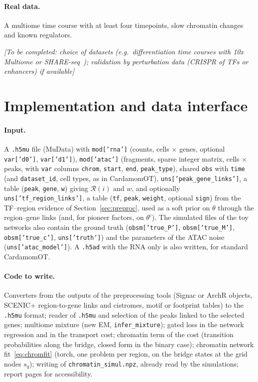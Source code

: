 \documentclass[a4paper, 11pt]{article}
\newcommand{\thc}{\theta^{\mathrm{c}}}
\newcommand{\Rg}{\mathcal{R}}
\newcommand{\tofill}[1]{\par\smallskip\noindent\emph{[To be completed: #1]}\par\smallskip}
\theoremstyle{plain}
\theoremstyle{remark}
\begin{document}
\paragraph{Real data.} A multiome time course with at least four timepoints, slow chromatin changes and known regulators.
\tofill{choice of datasets (e.g.\ differentiation time courses with 10x Multiome or SHARE-seq~\cite{ma2020shareseq}); validation by perturbation data (CRISPR of TFs or enhancers) if available}

\section{Implementation and data interface}\label{sec:data}

\paragraph{Input.} A \texttt{.h5mu} file (MuData) with \texttt{mod['rna']} (counts, cells $\times$ genes, optional \texttt{var['d0']}, \texttt{var['d1']}), \texttt{mod['atac']} (fragments, sparse integer matrix, cells $\times$ peaks, with \texttt{var} columns \texttt{chrom}, \texttt{start}, \texttt{end}, \texttt{peak\_type}), shared \texttt{obs} with \texttt{time} (and \texttt{dataset\_id}, cell types, as in CardamomOT), \texttt{uns['peak\_gene\_links']}, a table (\texttt{peak}, \texttt{gene}, \texttt{w}) giving $\Rg(i)$ and $w$, and optionally \texttt{uns['tf\_region\_links']}, a table (\texttt{tf}, \texttt{peak}, \texttt{weight}, optional \texttt{sign}) from the TF--region evidence of Section~\ref{sec:preproc}, used as a soft prior on $\theta$ through the region--gene links (and, for pioneer factors, on $\thc$). The simulated files of the toy networks also contain the ground truth (\texttt{obsm['true\_P']}, \texttt{obsm['true\_M']}, \texttt{obsm['true\_c']}, \texttt{uns['truth']}) and the parameters of the ATAC noise (\texttt{uns['atac\_model']}). A \texttt{.h5ad} with the RNA only is also written, for standard CardamomOT.

\paragraph{Code to write.} Converters from the outputs of the preprocessing tools (Signac or ArchR objects, SCENIC+ region-to-gene links and cistromes, motif or footprint tables) to the \texttt{.h5mu} format; reader of \texttt{.h5mu} and selection of the peaks linked to the selected genes; multiome mixture (new EM, \texttt{infer\_mixture}); gated loss in the network regression and in the transport cost; chromatin term of the cost (transition probabilities along the bridge, closed form in the binary case); chromatin network fit~\eqref{eq:chromfit} (torch, one problem per region, on the bridge states at the grid nodes $s_q$); writing of \texttt{chromatin\_simul.npz}, already read by the simulations; report pages for accessibility.
\end{document}
